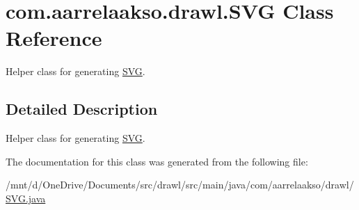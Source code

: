 \hypertarget{classcom_1_1aarrelaakso_1_1drawl_1_1_s_v_g}{}\section{com.\+aarrelaakso.\+drawl.\+S\+VG Class Reference}
\label{classcom_1_1aarrelaakso_1_1drawl_1_1_s_v_g}


Helper class for generating \hyperlink{classcom_1_1aarrelaakso_1_1drawl_1_1_s_v_g}{S\+VG}.  




\subsection{Detailed Description}
Helper class for generating \hyperlink{classcom_1_1aarrelaakso_1_1drawl_1_1_s_v_g}{S\+VG}. 

The documentation for this class was generated from the following file\+:\begin{DoxyCompactItemize}
\item 
/mnt/d/\+One\+Drive/\+Documents/src/drawl/src/main/java/com/aarrelaakso/drawl/\hyperlink{_s_v_g_8java}{S\+V\+G.\+java}\end{DoxyCompactItemize}

